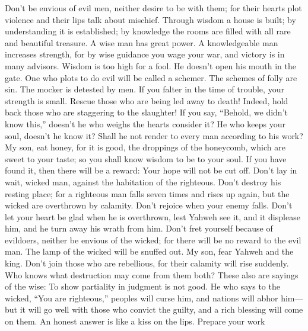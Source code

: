  Don't be envious of evil men, neither desire to be with
them;  for their hearts plot violence and their lips talk
about mischief.  Through wisdom a house is built; by
understanding it is established;  by knowledge the rooms
are filled with all rare and beautiful treasure.  A wise
man has great power. A knowledgeable man increases strength,
 for by wise guidance you wage your war, and victory is in
many advisors.  Wisdom is too high for a fool. He doesn't
open his mouth in the gate.  One who plots to do evil will
be called a schemer.  The schemes of folly are sin. The
mocker is detested by men.  If you falter in the time of
trouble, your strength is small.  Rescue those who are
being led away to death! Indeed, hold back those who are staggering to
the slaughter!  If you say, ``Behold, we didn't know
this,'' doesn't he who weighs the hearts consider it? He who keeps your
soul, doesn't he know it? Shall he not render to every man according to
his work?  My son, eat honey, for it is good, the
droppings of the honeycomb, which are sweet to your taste;
 so you shall know wisdom to be to your soul. If you have
found it, then there will be a reward: Your hope will not be cut off.
 Don't lay in wait, wicked man, against the habitation of
the righteous. Don't destroy his resting place;  for a
righteous man falls seven times and rises up again, but the wicked are
overthrown by calamity.  Don't rejoice when your enemy
falls. Don't let your heart be glad when he is overthrown,
 lest Yahweh see it, and it displease him, and he turn
away his wrath from him.  Don't fret yourself because of
evildoers, neither be envious of the wicked;  for there
will be no reward to the evil man. The lamp of the wicked will be
snuffed out.  My son, fear Yahweh and the king. Don't
join those who are rebellious,  for their calamity will
rise suddenly. Who knows what destruction may come from them both?
 These also are sayings of the wise: To show partiality
in judgment is not good.  He who says to the wicked,
``You are righteous,'' peoples will curse him, and nations will abhor
him---  but it will go well with those who convict the
guilty, and a rich blessing will come on them.  An honest
answer is like a kiss on the lips.  Prepare your work
